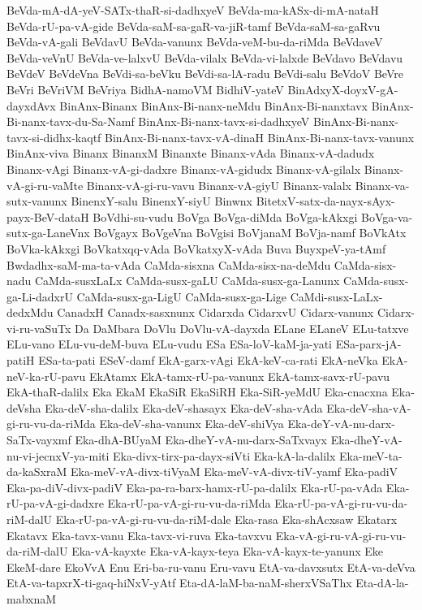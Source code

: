 {BeVda-mA-dA-yeV-SATx-thaR-si-dadhxyeV
BeVda-ma-kASx-di-mA-nataH
BeVda-rU-pa-vA-gide
BeVda-saM-sa-gaR-va-jiR-tamf
BeVda-saM-sa-gaRvu
BeVda-vA-gali
BeVdavU
BeVda-vanunx
BeVda-veM-bu-da-riMda
BeVdaveV
BeVda-veVnU
BeVda-ve-lalxvU
BeVda-vilalx
BeVda-vi-lalxde
BeVdavo
BeVdavu
BeVdeV
BeVdeVna
BeVdi-sa-beVku
BeVdi-sa-lA-radu
BeVdi-salu
BeVdoV
BeVre
BeVri
BeVriVM
BeVriya
BidhA-namoVM
BidhiV-yateV
BinAdxyX-doyxV-gA-dayxdAvx
BinAnx-Binanx
BinAnx-Bi-nanx-neMdu
BinAnx-Bi-nanxtavx
BinAnx-Bi-nanx-tavx-du-Sa-Namf
BinAnx-Bi-nanx-tavx-si-dadhxyeV
BinAnx-Bi-nanx-tavx-si-didhx-kaqtf
BinAnx-Bi-nanx-tavx-vA-dinaH
BinAnx-Bi-nanx-tavx-vanunx
BinAnx-viva
Binanx
BinanxM
Binanxte
Binanx-vAda
Binanx-vA-dadudx
Binanx-vAgi
Binanx-vA-gi-dadxre
Binanx-vA-gidudx
Binanx-vA-gilalx
Binanx-vA-gi-ru-vaMte
Binanx-vA-gi-ru-vavu
Binanx-vA-giyU
Binanx-valalx
Binanx-va-sutx-vanunx
BinenxY-salu
BinenxY-siyU
Binwnx
BitetxV-satx-da-nayx-sAyx-payx-BeV-dataH
BoVdhi-su-vudu
BoVga
BoVga-diMda
BoVga-kAkxgi
BoVga-va-sutx-ga-LaneVnx
BoVgayx
BoVgeVna
BoVgisi
BoVjanaM
BoVja-namf
BoVkAtx
BoVka-kAkxgi
BoVkatxqq-vAda
BoVkatxyX-vAda
Buva
BuyxpeV-ya-tAmf
Bwdadhx-saM-ma-ta-vAda
CaMda-sisxna
CaMda-sisx-na-deMdu
CaMda-sisx-nadu
CaMda-susxLaLx
CaMda-susx-gaLU
CaMda-susx-ga-Lanunx
CaMda-susx-ga-Li-dadxrU
CaMda-susx-ga-LigU
CaMda-susx-ga-Lige
CaMdi-susx-LaLx-dedxMdu
CanadxH
Canadx-sasxnunx
Cidarxda
CidarxvU
Cidarx-vanunx
Cidarx-vi-ru-vaSuTx
Da
DaMbara
DoVlu
DoVlu-vA-dayxda
ELane
ELaneV
ELu-tatxve
ELu-vano
ELu-vu-deM-buva
ELu-vudu
ESa
ESa-loV-kaM-ja-yati
ESa-parx-jA-patiH
ESa-ta-pati
ESeV-damf
EkA-garx-vAgi
EkA-keV-ca-rati
EkA-neVka
EkA-neV-ka-rU-pavu
EkAtamx
EkA-tamx-rU-pa-vanunx
EkA-tamx-savx-rU-pavu
EkA-thaR-dalilx
Eka
EkaM
EkaSiR
EkaSiRH
Eka-SiR-yeMdU
Eka-cnacxna
Eka-deVsha
Eka-deV-sha-dalilx
Eka-deV-shasayx
Eka-deV-sha-vAda
Eka-deV-sha-vA-gi-ru-vu-da-riMda
Eka-deV-sha-vanunx
Eka-deV-shiVya
Eka-deY-vA-nu-darx-SaTx-vayxmf
Eka-dhA-BUyaM
Eka-dheY-vA-nu-darx-SaTxvayx
Eka-dheY-vA-nu-vi-jecnxV-ya-miti
Eka-divx-tirx-pa-dayx-siVti
Eka-kA-la-dalilx
Eka-meV-ta-da-kaSxraM
Eka-meV-vA-divx-tiVyaM
Eka-meV-vA-divx-tiV-yamf
Eka-padiV
Eka-pa-diV-divx-padiV
Eka-pa-ra-barx-hamx-rU-pa-dalilx
Eka-rU-pa-vAda
Eka-rU-pa-vA-gi-dadxre
Eka-rU-pa-vA-gi-ru-vu-da-riMda
Eka-rU-pa-vA-gi-ru-vu-da-riM-dalU
Eka-rU-pa-vA-gi-ru-vu-da-riM-dale
Eka-rasa
Eka-shAcxsaw
Ekatarx
Ekatavx
Eka-tavx-vanu
Eka-tavx-vi-ruva
Eka-tavxvu
Eka-vA-gi-ru-vA-gi-ru-vu-da-riM-dalU
Eka-vA-kayxte
Eka-vA-kayx-teya
Eka-vA-kayx-te-yanunx
Eke
EkeM-dare
EkoVvA
Enu
Eri-ba-ru-vanu
Eru-vavu
EtA-va-davxsutx
EtA-va-deVva
EtA-va-tapxrX-ti-gaq-hiNxV-yAtf
Eta-dA-laM-ba-naM-sherxVSaThx
Eta-dA-la-mabxnaM
}
